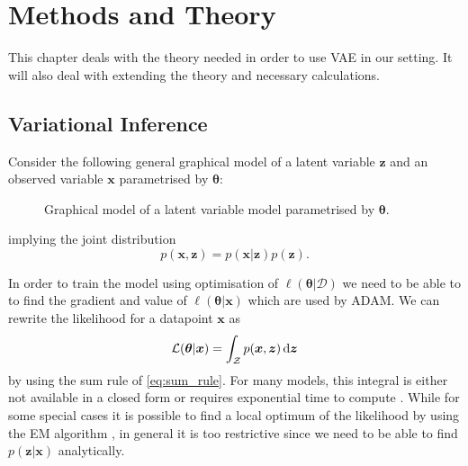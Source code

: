 \chapter{Methods and Theory}
\label{MethodsCh}

This chapter deals with the theory needed in order to use VAE in our setting. It
will also deal with extending the theory and necessary calculations.

\section{Variational Inference}
Consider the following general graphical model of a latent variable $\bm{z}$ and
an observed variable $\bm{x}$ parametrised by $\bm{\theta}$:
\begin{figure}[H]
  \label{fig:latent_variable_model}
  \centering
  \caption{Graphical model of a latent variable model parametrised by $\bm{\theta}$.}
\end{figure}
implying the joint distribution
\begin{equation}
  \label{eq:latent_variable_model}
  p(\bm{x}, \bm{z}) = p(\bm{x} | \bm{z}) p(\bm{z}).
\end{equation}

In order to train the model using optimisation of
$\ell(\bm{\theta} | \mathcal{D})$ we need to be able to to find the gradient and
value of $\ell(\bm{\theta} | \bm{x})$ which are used by ADAM. We can rewrite
the likelihood for a datapoint $\bm{x}$ as
\begin{equation}
  \label{eq:likelihood_integrate_out_latent}
  \mathcal{L}(\bm{\theta} | \bm{x}) = \int_{\mathcal{Z}} p(\bm{x}, \bm{z}) \dif \bm{z}
\end{equation}
by using the sum rule of \ref{eq:sum_rule}. For many models, this integral is
either not available in a closed form or requires exponential time to compute
\cite{blei_variational_2017}. While for some special cases it is possible to
find a local optimum of the likelihood by using the EM algorithm
\cite{Dempster77maximumlikelihood}, in general it is too restrictive since we
need to be able to find $p(\bm{z} | \bm{x})$ analytically.

